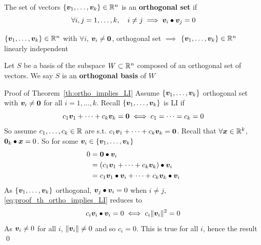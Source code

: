 \documentclass[aspectratio=169]{beamer}\usepackage[]{graphicx}\usepackage[]{xcolor}
\begin{document}
\begin{frame}
\begin{definition}
The set of vectors $\{\bm{v}_1,\ldots,\bm{v}_k\}\in\mathbb{R}^n$ is an \textbf{orthogonal set} if
\[
\forall i,j=1,\ldots,k,\quad i\neq j \implies \bm{v}_i\bullet\bm{v}_j=0
\]
\end{definition}

\begin{theorem}\label{th:ortho_implies_LI}
$\{\bm{v}_1,\ldots,\bm{v}_k\}\in\mathbb{R}^n$ with $\forall i$, $\bv_i\neq\b0$, orthogonal set $\implies$ $\{\bm{v}_1,\ldots,\bm{v}_k\}\in\mathbb{R}^n$ linearly independent
\end{theorem}

\begin{definition}
Let $S$ be a basis of the subspace $W\subset\mathbb{R}^n$ composed of an orthogonal set of vectors. We say $S$ is an \textbf{orthogonal basis} of $W$
\end{definition}
\end{frame}

\begin{frame}{Proof of Theorem~\ref{th:ortho_implies_LI}}
Assume $\{\bm{v}_1,\ldots,\bm{v}_k\}$ orthogonal set with $\bv_i\neq\b0$ for all $i=1,\ldots,k$. Recall $\{\bm{v}_1,\ldots,\bm{v}_k\}$ is LI if 
\[
c_1\bv_1+\cdots+c_k\bv_k=\b0\iff c_1=\cdots=c_k=0
\]
So assume $c_1,\ldots,c_k\in\mathbb{R}$ are s.t. $c_1\bv_1+\cdots+c_k\bv_k=\b0$.
Recall that $\forall\bm{x}\in\mathbb{R}^k$, $\b0_k\bullet\bx=0$. So for some $\bm{v}_i\in\{\bm{v}_1,\ldots,\bm{v}_k\}$
\begin{align}
0 &= \b0\bullet\bv_i \nonumber \\
&= (c_1\bv_1+\cdots+c_k\bv_k)\bullet\bv_i \nonumber \\
&= c_1\bv_1\bullet\bv_i+\cdots+c_k\bv_k\bullet\bv_i \label{eq:proof_th_ortho_implies_LI}
\end{align}
As $\{\bm{v}_1,\ldots,\bm{v}_k\}$ orthogonal, $\bm{v}_j\bullet\bm{v}_i=0$ when $i\neq j$, \eqref{eq:proof_th_ortho_implies_LI} reduces to
\[
c_i\bm{v}_i\bullet\bm{v}_i = 0 \iff c_i\|\bm{v}_i\|^2 = 0
\]
As $\bm{v}_i\neq 0$ for all $i$, $\|\bm{v}_i\|\neq 0$ and so $c_i=0$. This is true for all $i$, hence the result \hfill\qed
\end{frame}
\end{document}
